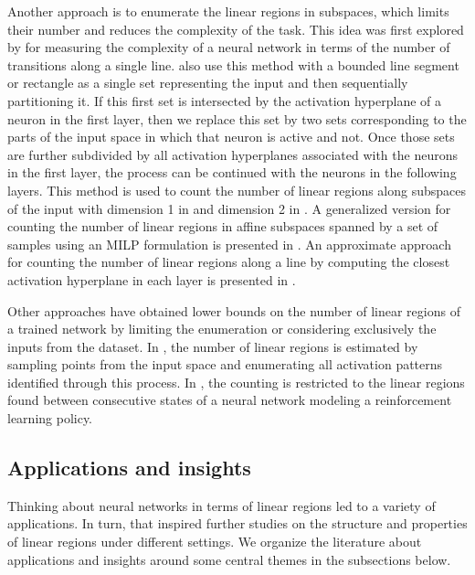 Another approach is to enumerate the linear regions in subspaces, which limits their number and reduces the complexity of the task. 
This idea was first explored by \cite{novak2018sensitivity} for measuring the complexity of a neural network in terms of the number of transitions along a single line. 
\cite{hanin2019complexity,hanin2019deep} also use this method with a bounded line segment or rectangle as a single set representing the input and then sequentially partitioning it. 
If this first set is intersected by the activation hyperplane of a neuron in the first layer, 
then we replace this set by two sets corresponding to the parts of the input space in which that neuron is active and not. 
Once those sets are further subdivided by all activation hyperplanes associated with the neurons in the first layer, 
the process can be continued with the neurons in the following layers. 
This method is used to count the number of linear regions along subspaces of the input with dimension 1 in \cite{hanin2019complexity} and dimension 2 in \cite{hanin2019deep}. 
A generalized version for counting the number of linear regions in affine subspaces spanned by a set of samples using an MILP formulation is presented in \cite{cai2023pruning}. 
An approximate approach for counting the number of linear regions along a line by computing the closest activation hyperplane in each layer is presented in \cite{gamba2022equal}. 


Other approaches have obtained lower bounds on the number of linear regions of a trained network by limiting the enumeration or considering exclusively the inputs from the dataset. 
In \cite{xiong2020cnn}, the number of linear regions is estimated by sampling points from the input space and enumerating all activation patterns identified through this process. 
In \cite{cohan2022evolution}, the counting is restricted to the linear regions found between consecutive states of a neural network modeling a reinforcement learning policy. 



\subsection{Applications and insights}

Thinking about neural networks in terms of linear regions led to a variety of applications. 
In turn, that inspired further studies on the structure and properties of linear regions under different settings. 
We organize the literature about applications and insights around some central themes in the subsections below. 



